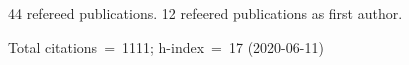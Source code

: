 44 refereed publications. 12 refeered publications as first author.

Total citations~=~1111; h-index~=~17 (2020-06-11)